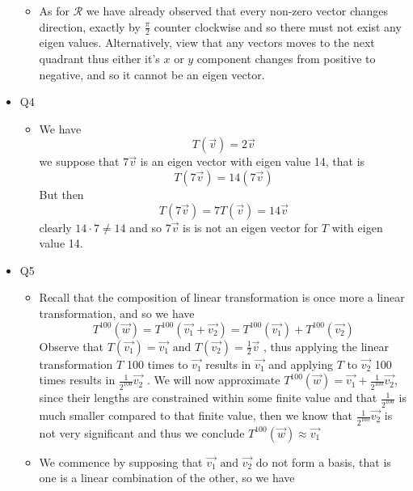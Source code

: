 \documentclass[11pt]{book}
\begin{document}
\begin{itemize}
\begin{itemize}
                \item As for $\mathcal{R}$ we have already observed that every non-zero vector changes direction, exactly by $\frac{\pi}{2} $ counter clockwise and so there must not exist any eigen values. Alternatively, view that any vectors moves to the next quadrant thus either it's $x$ or $y$ component changes from positive to negative, and so it cannot be an eigen vector.    
            \end{itemize}
        \item Q4
            \begin{itemize}
                \item We have 
                    \[
                    T\left(\vec{v} \right) = 2\vec{v} 
                    \]
                    we suppose that $7\vec{v} $ is an eigen vector with eigen value 14, that is
                    \[
                        T\left(7\vec{v} \right) = 14\left( 7\vec{v}  \right) 
                    \]
                    But then 
                    \[
                    T\left(7\vec{v} \right) = 7T\left(\vec{v} \right) = 14\vec{v} 
                    \]
                    clearly $14 \cdot 7 \neq 14$ and so $7\vec{v} $ is is not an eigen vector for $T$ with eigen value 14.  
            \end{itemize}
        \item Q5
        \begin{itemize}
            \item Recall that the composition of linear transformation is once more a linear transformation, and so we have 
                \[
                T^{100} \left(\vec{w} \right) = T^{100} \left(\vec{v_1}  + \vec{v_2} \right) = T^{100} \left(\vec{v_1} \right)  + T^{100} \left(\vec{v_2} \right) 
                \]
                Observe that $T\left(\vec{v_1} \right) = \vec{v_1} \text{ and } T\left(\vec{v_2} \right) = \frac{1}{2}\vec{v} $ , thus applying the linear transformation $T$ 100 times to $\vec{v_1} $ results in $\vec{v_1} $ and applying $T$ to $\vec{v_2} $ 100 times results in $\frac{1}{2^{100} }\vec{v_2} $ . We will now approximate $T^{100} \left(\vec{w} \right) = \vec{v_1}  + \frac{1}{2^{100} }\vec{v_2} $, since their lengths are constrained within some finite value and that $\frac{1}{2^{100} }$ is much smaller compared to that finite value, then we know that $\frac{1}{2^{100} }\vec{v_2} $ is not very significant and thus we conclude $T^{100} \left(\vec{w} \right) \approx \vec{v_1} $ 
            \item We commence by supposing that $\vec{v_1} \text{ and } \vec{v_2} $ do not form a basis, that is one is a linear combination of the other, so we have

\end{itemize}
\end{itemize}
\end{document}
